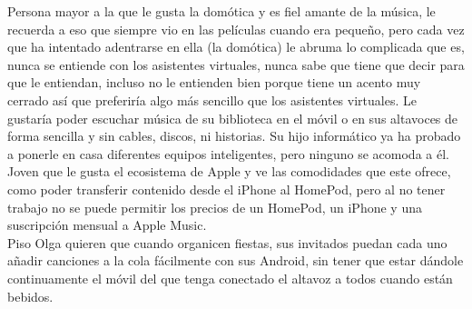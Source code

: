 Persona mayor a la que le gusta la domótica y es fiel amante de la música, le recuerda a eso que siempre vio en las películas cuando era pequeño, pero cada vez que ha intentado adentrarse en ella (la domótica) le abruma lo complicada que es, nunca se entiende con los asistentes virtuales, nunca sabe que tiene que decir para que le entiendan, incluso no le entienden bien porque tiene un acento muy cerrado así que preferiría algo más sencillo que los asistentes virtuales. Le gustaría poder escuchar música de su biblioteca en el móvil o en sus altavoces de forma sencilla y sin cables, discos, ni historias. Su hijo informático ya ha probado a ponerle en casa diferentes equipos inteligentes, pero ninguno se acomoda a él.\\

Joven que le gusta el ecosistema de Apple y ve las comodidades que este ofrece, como poder transferir contenido desde el iPhone al HomePod, pero al no tener trabajo no se puede permitir los precios de un HomePod, un iPhone y una suscripción mensual a Apple Music.\\

Piso Olga quieren que cuando organicen fiestas, sus invitados puedan cada uno añadir canciones a la cola fácilmente con sus Android, sin tener que estar dándole continuamente el móvil del que tenga conectado el altavoz a todos cuando están bebidos.\\
